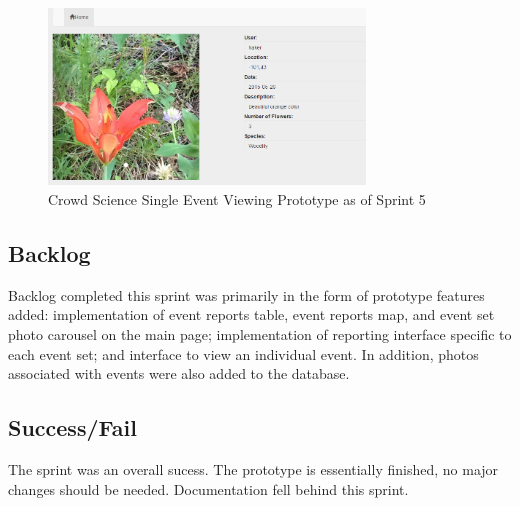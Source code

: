 \begin{figure}[tbh]
\begin{center}
\includegraphics[width=0.75\textwidth]{./figures/prototype_S5_view.png}
\end{center}
\caption{Crowd Science Single Event Viewing Prototype as of Sprint 5\label{prototype_S5_view}}
\end{figure}

\subsection{Backlog}
Backlog completed this sprint was primarily in the form of prototype features added: implementation of event reports table, event reports map, and event set photo carousel on the main page; implementation of reporting interface specific to each event set; and interface to view an individual event. In addition, photos associated with events were also added to the database.
\subsection{Success/Fail}
The sprint was an overall sucess.  The prototype is essentially finished, no major changes should be needed. Documentation fell behind this sprint.

